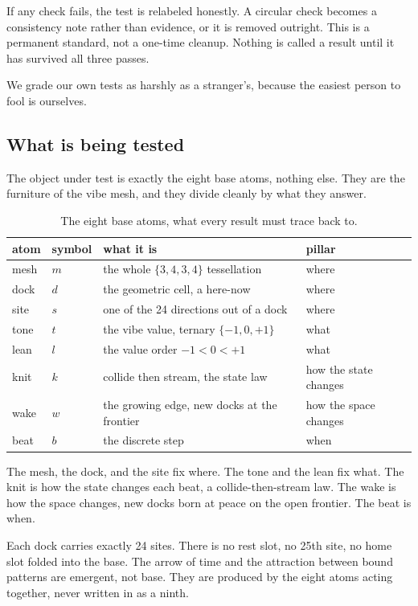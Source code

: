 If any check fails, the test is relabeled honestly. A circular check becomes a consistency note rather than evidence, or it is removed outright. This is a permanent standard, not a one-time cleanup. Nothing is called a result until it has survived all three passes.

\begin{principle}
We grade our own tests as harshly as a stranger's, because the easiest person to fool is ourselves.
\end{principle}

\subsection{What is being tested}

The object under test is exactly the eight base atoms, nothing else. They are the furniture of the vibe mesh, and they divide cleanly by what they answer.

\begin{table}[ht]
\centering
\begin{tabular}{@{}llll@{}}
\toprule
atom & symbol & what it is & pillar \\
\midrule
mesh & $m$ & the whole $\{3,4,3,4\}$ tessellation & where \\
dock & $d$ & the geometric cell, a here-now & where \\
site & $s$ & one of the 24 directions out of a dock & where \\
tone & $t$ & the vibe value, ternary $\{-1,0,+1\}$ & what \\
lean & $l$ & the value order $-1 < 0 < +1$ & what \\
knit & $k$ & collide then stream, the state law & how the state changes \\
wake & $w$ & the growing edge, new docks at the frontier & how the space changes \\
beat & $b$ & the discrete step & when \\
\bottomrule
\end{tabular}
\caption{The eight base atoms, what every result must trace back to.}
\label{tab:eight-atoms}
\end{table}

The mesh, the dock, and the site fix where. The tone and the lean fix what. The knit is how the state changes each beat, a collide-then-stream law. The wake is how the space changes, new docks born at peace on the open frontier. The beat is when.

Each dock carries exactly 24 sites. There is no rest slot, no 25th site, no home slot folded into the base. The arrow of time and the attraction between bound patterns are emergent, not base. They are produced by the eight atoms acting together, never written in as a ninth.

